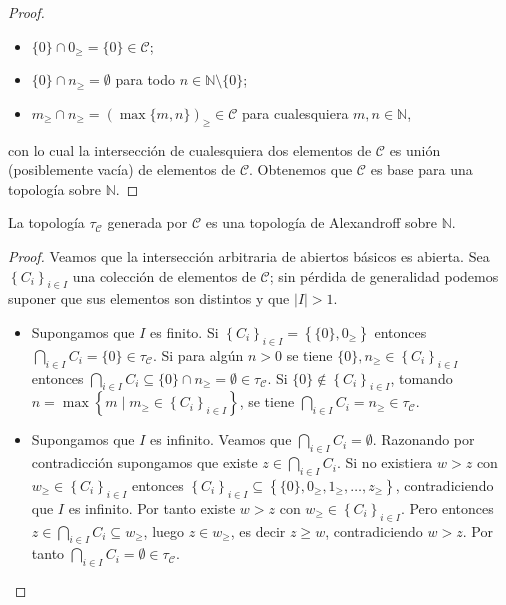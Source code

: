 {\begin{proof}
   \begin{itemize}
      \item $\{0\}\cap 0_{\ge}=\{0\}\in\mathcal{C}$;
      \item $\{0\}\cap n_{\ge}=\emptyset$ para todo $n\in\mathbb{N}\setminus\{0\}$;
      \item $m_{\ge}\cap n_{\ge}=\left(\max\{m,n\}\right)_{\ge}\in\mathcal{C}$ para cualesquiera $m,n\in\mathbb{N}$,
   \end{itemize}
   con lo cual la intersección de cualesquiera dos elementos de $\mathcal{C}$ es unión (posiblemente vacía) de elementos de $\mathcal{C}$. Obtenemos que $\mathcal{C}$ es base para una topología sobre $\mathbb{N}$.
\end{proof}
\begin{Prop}
   La topología $\tau_{\mathcal{C}}$ generada por $\mathcal{C}$ es una topología de Alexandroff sobre $\mathbb{N}$.
\end{Prop}
\begin{proof}
   Veamos que la intersección arbitraria de abiertos básicos es abierta. Sea $\left\lbrace C_i\right\rbrace_{i\in I}$ una colección de elementos de $\mathcal{C}$; sin pérdida de generalidad podemos suponer que sus elementos son distintos y que $|I|>1$.
   \begin{itemize}
      \item Supongamos que $I$ es finito. Si $\left\lbrace C_i\right\rbrace_{i\in I}=\left\lbrace \{0\},0_{\ge}\right\rbrace$ entonces $\bigcap_{i\in I}C_i=\{0\}\in\tau_{\mathcal{C}}$. Si para algún $n>0$ se tiene $\{0\},n_{\ge}\in\left\lbrace C_i\right\rbrace_{i\in I}$ entonces $\bigcap_{i\in I}C_i\subseteq\{0\}\cap n_{\ge}=\emptyset\in\tau_{\mathcal{C}}$. Si $\{0\}\notin\left\lbrace C_i\right\rbrace_{i\in I}$, tomando $n=\max\left\lbrace m\mid m_{\ge}\in\left\lbrace C_i\right\rbrace_{i\in I}\right\rbrace$, se tiene $\bigcap_{i\in I}C_i=n_{\ge}\in\tau_{\mathcal{C}}$.
      \item Supongamos que $I$ es infinito. Veamos que $\bigcap_{i\in I}C_i=\emptyset$. Razonando por contradicción supongamos que existe $z\in\bigcap_{i\in I}C_i$. Si no existiera $w>z$ con $w_{\ge}\in\left\lbrace C_i\right\rbrace_{i\in I}$ entonces $\left\lbrace C_i\right\rbrace_{i\in I}\subseteq\left\lbrace \{0\},0_{\ge},1_{\ge},\dots,z_{\ge}\right\rbrace$, contradiciendo que $I$ es infinito. Por tanto existe $w>z$ con $w_{\ge}\in\left\lbrace C_i\right\rbrace_{i\in I}$. Pero entonces $z\in\bigcap_{i\in I}C_i\subseteq w_{\ge}$, luego $z\in w_{\ge}$, es decir $z\ge w$, contradiciendo $w>z$. Por tanto $\bigcap_{i\in I}C_i=\emptyset\in\tau_{\mathcal{C}}$.

\end{itemize}
\end{proof}}
